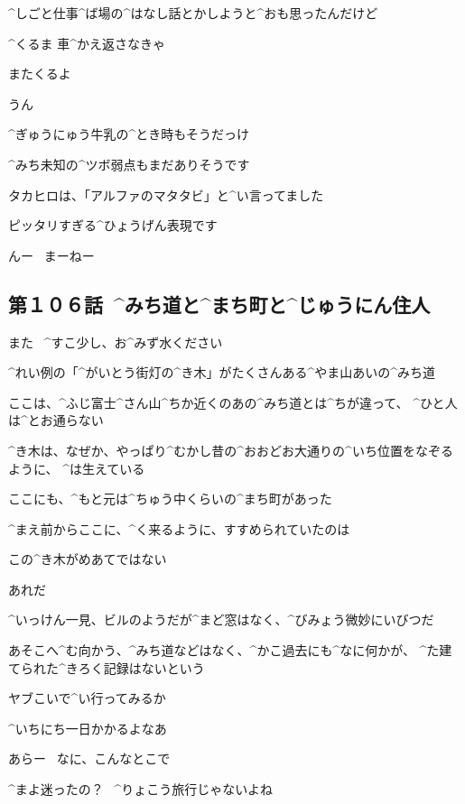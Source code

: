 \Takahiro ^{しごと}{仕事}^{ば}{場}の^{はなし}{話}とかしようと^{おも}{思}ったんだけど

\Takahiro ^{くるま }{車}^{かえ}{返}さなきゃ

\Takahiro またくるよ

\Alpha うん

\Alpha ^{ぎゅうにゅう}{牛乳}の^{とき}{時}もそうだっけ

\Alpha ^{みち}{未知}の^{ツボ}{弱点}もまだありそうです

\page[84]
\Alpha タカヒロは、「アルファのマタタビ」と^{い}{言}ってました

\Alpha ピッタリすぎる^{ひょうげん}{表現}です

\Alpha んー
\ まーねー


\subsection{第１０６話\ ^{みち}{道}と^{まち}{町}と^{じゅうにん}{住人}}

\page[87]
\Alpha また
\ ^{すこ}{少}し、お^{みず}{水}ください

\page[88]
\Ayase ^{れい}{例}の「^{がいとう}{街灯}の^{き}{木}」がたくさんある^{やま}{山}あいの^{みち}{道}

\Ayase ここは、^{ふじ}{富士}^{さん}{山}^{ちか}{近}くのあの^{みち}{道}とは^{ちが}{違}って、
^{ひと}{人}は^{とお}{通}らない

\page[89]
\Ayase ^{き}{木}は、なぜか、やっぱり^{むかし}{昔}の^{おおどお}{大通}りの^{いち}{位置}をなぞるように、
^{は}{生}えている

\Ayase ここにも、^{もと}{元}は^{ちゅう}{中}くらいの^{まち}{町}があった

\Ayase ^{まえ}{前}からここに、^{く}{来}るように、すすめられていたのは

\Ayase この^{き}{木}がめあてではない

\Ayase あれだ

\page[90]
\Ayase ^{いっけん}{一見}、ビルのようだが^{まど}{窓}はなく、^{びみょう}{微妙}にいびつだ

\Ayase あそこへ^{む}{向}かう、^{みち}{道}などはなく、^{かこ}{過去}にも^{なに}{何}かが、
^{た}{建}てられた^{きろく}{記録}はないという

\Ayase ヤブこいで^{い}{行}ってみるか

\Ayase ^{いちにち}{一日}かかるよなあ

\page[91]
\Person あらー
\ なに、こんなとこで

\Person ^{まよ}{迷}ったの？
\ ^{りょこう}{旅行}じゃないよね

